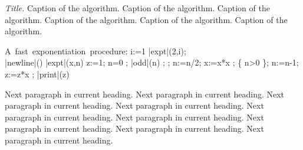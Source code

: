 \begin{myalgorithm}[h]
\centering
\caption[Title]{\textit{Title.} Caption of the algorithm. Caption of the algorithm.
Caption of the algorithm. Caption of the algorithm. Caption of the algorithm.
Caption of the algorithm.}
\HRule
\vspace{-9mm}
\begin{program}
\vspace{-2mm}
\mbox{A fast exponentiation procedure:}
\BEGIN %
  \FOR i:=1   \DO
     |expt|(2,i); \\ |newline|() \OD %
\WHERE
\PROC |expt|(x,n) \BODY
          z:=1;
          \DO \IF n=0 \THEN \EXIT \FI;
             \DO \IF |odd|(n) \THEN \EXIT \FI;
;
                n:=n/2; x:=x*x \OD;
             \{ n>0 \};
             n:=n-1; z:=z*x \OD;
          |print|(z) \ENDPROC
\END
\end{program}
\vspace{-5mm}
\end{myalgorithm}
\vspace{-2mm}

%
%

%
%
%

%
%
%


Next paragraph in current heading. Next paragraph in current heading.
Next paragraph in current heading. Next paragraph in current heading.
Next paragraph in current heading. Next paragraph in current heading.
Next paragraph in current heading. Next paragraph in current heading.
Next paragraph in current heading.

